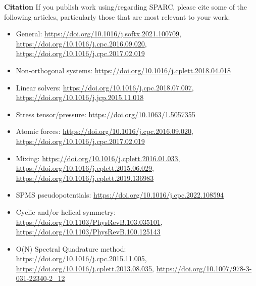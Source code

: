 \begin{frame}[allowframebreaks]{\textbf{Citation}} \label{Citation}
If you publish work using/regarding SPARC, please cite some of the following articles, particularly those that are most relevant to your work:
\begin{itemize}
    \item General: \url{https://doi.org/10.1016/j.softx.2021.100709}, \url{https://doi.org/10.1016/j.cpc.2016.09.020}, \url{https://doi.org/10.1016/j.cpc.2017.02.019}
    \item Non-orthogonal systems: \url{https://doi.org/10.1016/j.cplett.2018.04.018}
    \item Linear solvers: \url{https://doi.org/10.1016/j.cpc.2018.07.007},    \url{https://doi.org/10.1016/j.jcp.2015.11.018}
    \item Stress tensor/pressure: \url{https://doi.org/10.1063/1.5057355}
    \item Atomic forces: \url{https://doi.org/10.1016/j.cpc.2016.09.020}, \url{https://doi.org/10.1016/j.cpc.2017.02.019}
    \item Mixing: \url{https://doi.org/10.1016/j.cplett.2016.01.033}, \url{https://doi.org/10.1016/j.cplett.2015.06.029}, \url{https://doi.org/10.1016/j.cplett.2019.136983}
    \item SPMS pseudopotentials: \url{https://doi.org/10.1016/j.cpc.2022.108594}
    \item Cyclic and/or helical symmetry:
    \url{https://doi.org/10.1103/PhysRevB.103.035101},
    \url{https://doi.org/10.1103/PhysRevB.100.125143}
    \item O(N) Spectral Quadrature method:
    \url{https://doi.org/10.1016/j.cpc.2015.11.005},
    \url{https://doi.org/10.1016/j.cplett.2013.08.035},
    \url{https://doi.org/10.1007/978-3-031-22340-2_12}
\end{itemize}
\end{frame}
  
